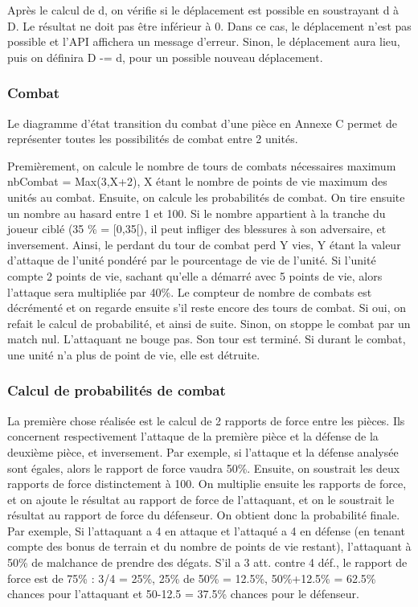 Après le calcul de d, on vérifie si le déplacement est possible en soustrayant d à D. Le résultat ne doit pas être inférieur à 0. Dans ce cas, le déplacement n'est pas possible et l'API affichera un message d'erreur. Sinon, le déplacement aura lieu, puis on définira D -= d, pour un possible nouveau déplacement.

\subsubsection{Combat}
Le diagramme d'état transition du combat d'une pièce en Annexe C permet de représenter toutes les possibilités de combat entre 2 unités. 

Premièrement, on calcule le nombre de tours de combats nécessaires maximum \smallbreak 
nbCombat = Max(3,X+2), X étant le nombre de points de vie maximum des unités au combat. Ensuite, on calcule les probabilités de combat. On tire ensuite un nombre au hasard entre 1 et 100. Si le nombre appartient à la tranche du joueur ciblé (35 \% = [0,35[), il peut infliger des blessures à son adversaire, et inversement. Ainsi, le perdant du tour de combat perd Y vies, Y étant la valeur d'attaque de l'unité pondéré par le pourcentage de vie de l'unité. Si l'unité compte 2 points de vie, sachant qu'elle a démarré avec 5 points de vie, alors l'attaque sera multipliée par 40\%. Le compteur de nombre de combats est décrémenté et on regarde ensuite s'il reste encore des tours de combat. Si oui, on refait le calcul de probabilité, et ainsi de suite. Sinon, on stoppe le combat par un match nul. L'attaquant ne bouge pas. Son tour est terminé. Si durant le combat, une unité n'a plus de point de vie, elle est détruite.

\subsubsection{Calcul de probabilités de combat}
La première chose réalisée est le calcul de 2 rapports de force entre les pièces. Ils concernent respectivement l'attaque de la première pièce et la défense de la deuxième pièce, et inversement. Par exemple, si l'attaque et la défense analysée sont égales, alors le rapport de force vaudra 50\%. Ensuite, on soustrait les deux rapports de force distinctement à 100. On multiplie ensuite les rapports de force, et on ajoute le résultat au rapport de force de l'attaquant, et on le soustrait le résultat au rapport de force du défenseur. On obtient donc la probabilité finale.
Par exemple, Si l’attaquant a 4 en attaque et l’attaqué a 4 en défense
(en tenant compte des bonus de terrain et du nombre de points de vie restant), l’attaquant à 50\%
de malchance de prendre des dégats. S’il a 3 att. contre 4 déf., le rapport de force est de 75\% : 3/4
= 25\%, 25\% de 50\% = 12.5\%, 50\%+12.5\% = 62.5\% chances pour l'attaquant et 50-12.5 = 37.5\% chances pour le défenseur.


